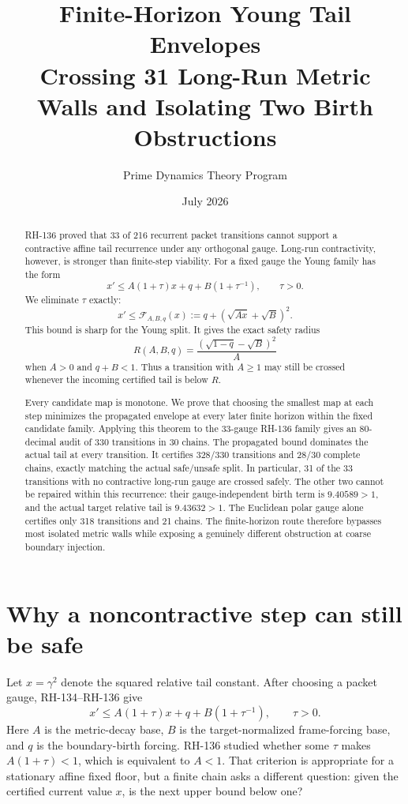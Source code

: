\documentclass[12pt]{article}
\title{Finite-Horizon Young Tail Envelopes\\\large Crossing 31 Long-Run Metric Walls and Isolating Two Birth Obstructions}
\author{Prime Dynamics Theory Program}
\date{July 2026}
\begin{document}
\maketitle

\begin{abstract}
RH-136 proved that 33 of 216 recurrent packet transitions cannot support a
contractive affine tail recurrence under any orthogonal gauge.  Long-run
contractivity, however, is stronger than finite-step viability.  For a
fixed gauge the Young family has the form
\[
 x'\leq A(1+\tau)x+q+B(1+\tau^{-1}),\qquad \tau>0.
\]
We eliminate $\tau$ exactly:
\[
 x'\leq\mathcal F_{A,B,q}(x)
 :=q+(\sqrt{Ax}+\sqrt B)^2.
\]
This bound is sharp for the Young split.  It gives the exact safety radius
\[
 R(A,B,q)=\frac{(\sqrt{1-q}-\sqrt B)^2}{A}
\]
when $A>0$ and $q+B<1$.  Thus a transition with $A\geq1$ may still be
crossed whenever the incoming certified tail is below $R$.

Every candidate map is monotone.  We prove that choosing the smallest map at
each step minimizes the propagated envelope at every later finite horizon
within the fixed candidate family.  Applying this theorem to the 33-gauge
RH-136 family gives an 80-decimal audit of 330 transitions in 30 chains.  The
propagated bound dominates the actual tail at every transition.  It certifies
328/330 transitions and 28/30 complete chains, exactly matching the actual
safe/unsafe split.  In particular, 31 of the 33 transitions with no
contractive long-run gauge are crossed safely.  The other two cannot be
repaired within this recurrence: their gauge-independent birth term is
$9.40589>1$, and the actual target relative tail is $9.43632>1$.  The
Euclidean polar gauge alone certifies only 318 transitions and 21 chains.
The finite-horizon route therefore bypasses most isolated metric walls while
exposing a genuinely different obstruction at coarse boundary injection.
\end{abstract}

\section{Why a noncontractive step can still be safe}
Let $x=\gamma^2$ denote the squared relative tail constant.  After choosing
a packet gauge, RH-134--RH-136 give
\begin{equation}\label{eq:young}
 x'\leq A(1+\tau)x+q+B(1+\tau^{-1}),
 \qquad \tau>0.
\end{equation}
Here $A$ is the metric-decay base, $B$ is the target-normalized frame-forcing
base, and $q$ is the boundary-birth forcing.  RH-136 studied whether some
$\tau$ makes $A(1+\tau)<1$, which is equivalent to $A<1$.  That criterion is
appropriate for a stationary affine fixed floor, but a finite chain asks a
different question: given the certified current value $x$, is the next upper
bound below one?
\end{document}
